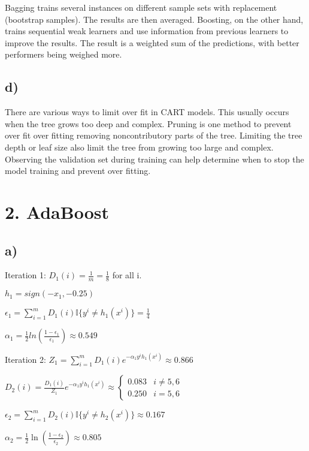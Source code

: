 \documentclass[
]{article}
\begin{document}
Bagging trains several instances on different sample sets with
replacement (bootstrap samples). The results are then averaged.
Boosting, on the other hand, trains sequential weak learners and use
information from previous learners to improve the results. The result is
a weighted sum of the predictions, with better performers being weighed
more.

\hypertarget{d}{%
\subsection{d)}\label{d}}

There are various ways to limit over fit in CART models. This usually
occurs when the tree grows too deep and complex. Pruning is one method
to prevent over fit over fitting removing noncontributory parts of the
tree. Limiting the tree depth or leaf size also limit the tree from
growing too large and complex. Observing the validation set during
training can help determine when to stop the model training and prevent
over fitting.

\hypertarget{adaboost}{%
\section{2. AdaBoost}\label{adaboost}}

\hypertarget{a-1}{%
\subsection{a)}\label{a-1}}

Iteration 1: \(D_1(i)= \frac{1}{m}=\frac{1}{8}\) for all i.

\(h_1=sign(-x_1,-0.25)\)

\(\epsilon_1=\sum_{i=1}^{m}D_1(i)\mathbb{I}\{y^i\ne h_1(x^i)\}=\frac{1}{4}\)

\(\alpha_1 = \frac{1}{2}ln(\frac{1-\epsilon_1}{\epsilon_1})\approx 0.549\)

Iteration 2:
\(Z_1 = \sum_{i=1}^m D_1(i)e^{-\alpha_1 y^i h_1(x^i)} \approx 0.866\)

\(D_2(i) = \frac{D_1(i)}{Z_1}e^{-\alpha_1 y^i h_1(x^i)} \approx \left\{ \begin{array}{lcr} 0.083 & i \neq 5,6 \\ 0.250 & i =5,6\end{array}\right.\)

\(\epsilon_2 = \sum_{i=1}^m D_2(i) \mathbb{I}\{y^i \neq h_2(x^i)\} \approx 0.167\)

\(\alpha_2 = \frac 1 2 \ln(\frac{1-\epsilon_2}{\epsilon_2}) \approx 0.805\)
\end{document}
